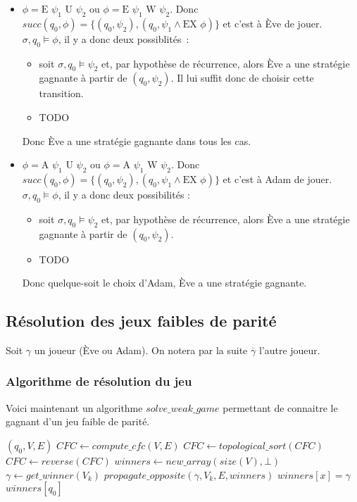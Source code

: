 \documentclass[10pt,a4paper]{article}
\begin{document}
\begin{itemize}
\item $\phi = \mbox{E } \psi_1 \mbox{ U } \psi_2$ ou $\phi = \mbox{E } \psi_1 \mbox{ W } \psi_2$. Donc $succ(q_0,\phi) = \{ (q_0,\psi_2), (q_0,\psi_1 \land \mbox{EX }  \phi) \}$ et c'est à Ève de jouer. $\sigma,q_0 \vDash \phi$, il y a donc deux possiblités :
\begin{itemize}
	\item soit $\sigma,q_0 \vDash \psi_2$ et, par hypothèse de récurrence, alors Ève a une stratégie gagnante à partir de $(q_0,\psi_2)$. Il lui suffit donc de choisir cette transition.
	\item TODO
\end{itemize}
Donc Ève a une stratégie gagnante dans tous les cas.

\item $\phi = \mbox{A } \psi_1 \mbox{ U } \psi_2$ ou $\phi = \mbox{A } \psi_1 \mbox{ W } \psi_2$. Donc $succ(q_0,\phi) = \{ (q_0,\psi_2), (q_0,\psi_1 \land \mbox{EX }  \phi) \}$ et c'est à Adam de jouer. $\sigma,q_0 \vDash \phi$, il y a donc deux possibilités :
\begin{itemize}
	\item soit $\sigma,q_0 \vDash \psi_2$ et, par hypothèse de récurrence, alors Ève a une stratégie gagnante à partir de $(q_0,\psi_2)$.
	\item TODO
\end{itemize}
Donc quelque-soit le choix d'Adam, Ève a une stratégie gagnante.
\end{itemize}

\subsection{Résolution des jeux faibles de parité}
Soit $\gamma$ un joueur (Ève ou Adam). On notera par la suite $\overline{\gamma}$ l'autre joueur.

\subsubsection{Algorithme de résolution du jeu}
Voici maintenant un algorithme $solve\_weak\_game$ permettant de connaitre le gagnant d'un jeu faible de parité.

\begin{algorithm}
	\caption{$solve\_weak\_game$}
\begin{algorithmic}[1]
	\REQUIRE $(q_0, V, E)$ 
	\STATE $CFC \leftarrow compute\_cfc(V, E)$
	\STATE $CFC \leftarrow topological\_sort(CFC)$
	\STATE $CFC \leftarrow reverse(CFC)$
	\STATE $winners \leftarrow new\_array(size(V), \bot)$
		\STATE $\gamma \leftarrow get\_winner(V_k)$
		\STATE $propagate\_opposite(\gamma, V_k, E, winners)$
				\STATE $winners[x] = \gamma$
			\ENDIF
		\ENDFOR
	\ENDFOR
	\RETURN $winners[q_0]$
\end{algorithmic}
\end{algorithm}
\end{document}
